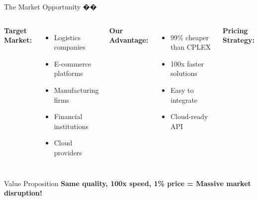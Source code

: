 \documentclass[aspectratio=169]{beamer}
\begin{document}
\begin{frame}{The Market Opportunity ��}
\begin{columns}
\textbf{Target Market:}
\begin{itemize}
    \item Logistics companies
    \item E-commerce platforms
    \item Manufacturing firms
    \item Financial institutions
    \item Cloud providers
\end{itemize}

\vspace{0.3cm}
\textbf{Our Advantage:}
\begin{itemize}
    \item \textcolor{aigreen}{99\% cheaper} than CPLEX
    \item \textcolor{aigreen}{100x faster} solutions
    \item \textcolor{aigreen}{Easy} to integrate
    \item \textcolor{aigreen}{Cloud-ready} API
\end{itemize}

\begin{center}
\textbf{Pricing Strategy:}

\vspace{0.3cm}
\end{center}
\end{columns}

\vspace{0.5cm}
\begin{block}{Value Proposition}
\textbf{Same quality, 100x speed, 1\% price = Massive market disruption!}
\end{block}
\end{frame}
\end{document}
